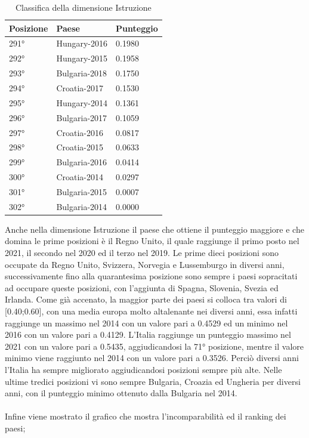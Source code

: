 \documentclass[a4paper,12pt, openright]{report}
\begin{document}
\begin{table}[h!]
    \centering
    \begin{tabular}{ |l|l|l|  }
        \hline
        \textbf{Posizione} & \textbf{Paese} & \textbf{Punteggio} \\
        \hline
        291° & Hungary-2016 & 0.1980 \\
        \hline
        292° & Hungary-2015 & 0.1958 \\
        \hline
        293° &  Bulgaria-2018 & 0.1750 \\
        \hline
        294° & Croatia-2017 & 0.1530 \\
        \hline
        295° &  Hungary-2014 & 0.1361 \\
        \hline
        296° &  Bulgaria-2017 & 0.1059 \\
        \hline
        297° &  Croatia-2016 & 0.0817 \\
        \hline
        298° &  Croatia-2015 & 0.0633 \\
        \hline
        299° &  Bulgaria-2016 & 0.0414 \\
        \hline
        300° &  Croatia-2014 & 0.0297 \\
        \hline
        301° &  Bulgaria-2015 & 0.0007 \\
        \hline
        302° &  Bulgaria-2014 & 0.0000 \\
        \hline
    \end{tabular}
    \caption{Classifica della dimensione Istruzione}
    \label{table:1}
\end{table}

Anche nella dimensione Istruzione il paese che ottiene il punteggio maggiore e che domina le prime posizioni è il Regno Unito, il quale raggiunge il 
primo posto nel 2021, il secondo nel 2020 ed il terzo nel 2019. Le prime dieci posizioni sono occupate da Regno Unito, Svizzera, Norvegia e Lussemburgo in diversi anni, 
successivamente fino alla quarantesima posizione sono sempre i paesi sopracitati ad occupare queste posizioni, con l'aggiunta di Spagna, Slovenia, Svezia ed Irlanda. 
Come già accenato, la 
maggior parte dei paesi si colloca tra valori di [0.40;0.60], con una media europa molto altalenante nei diversi anni, 
essa infatti raggiunge un massimo nel 2014 con un valore pari a 
0.4529 ed un minimo nel 2016 con un valore pari a 0.4129. L'Italia raggiunge un punteggio massimo nel 2021 con un valore 
pari a 0.5435, 
aggiudicandosi la 71° posizione,
mentre il valore minimo viene raggiunto nel 2014 con un valore pari a 0.3526. Perciò diversi anni l'Italia ha sempre migliorato 
aggiudicandosi posizioni sempre più alte. 
Nelle ultime tredici posizioni vi sono sempre Bulgaria, Croazia ed Ungheria per diversi anni, con il punteggio minimo ottenuto dalla 
Bulgaria nel 2014.
\\
\\
Infine viene mostrato il grafico che mostra l'incomparabilità ed il ranking dei paesi; 
\end{document}
